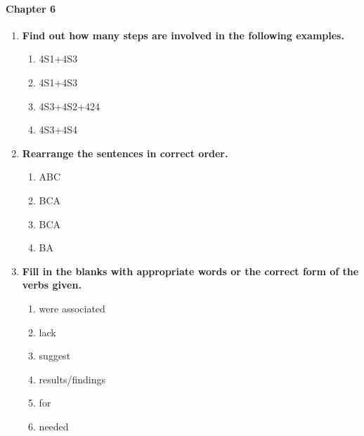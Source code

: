 \documentclass{ctexbook}
\begin{document}
\paragraph*{Chapter 6}\par
\begin{enumerate}
  \item \textbf{Find out how many steps are involved in the following examples.}
  \begin{enumerate}
    \item 4S1+4S3
    \item 4S1+4S3
    \item 4S3+4S2+424
    \item 4S3+4S4
  \end{enumerate}

  \item \textbf{Rearrange the sentences in correct order.}
  \begin{enumerate}
    \item ABC
    \item BCA
    \item BCA
    \item BA
  \end{enumerate}

  \item \textbf{Fill in the blanks with appropriate words or the correct form of the verbs given.}
  \begin{enumerate}
    \item were associated
    \item lack
    \item suggest
    \item results/findings
    \item for
    \item needed
  \end{enumerate}
\end{enumerate}


\backmatter



	
\end{document}
